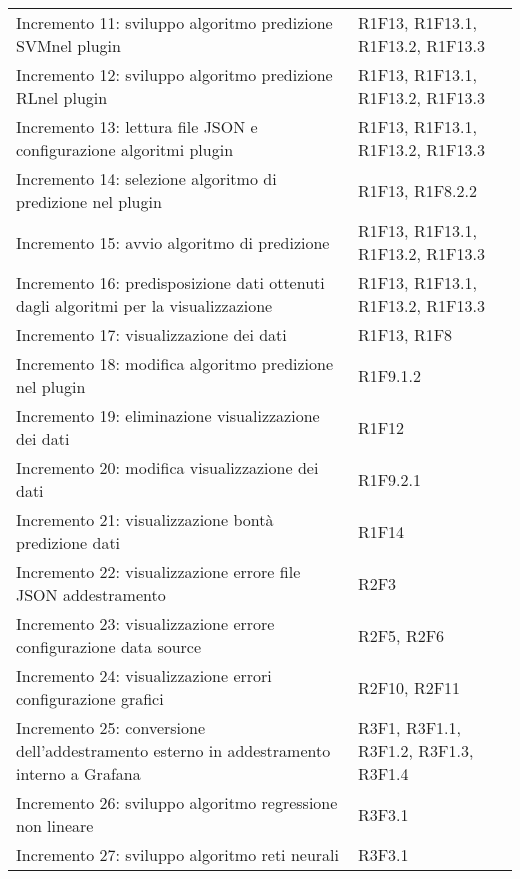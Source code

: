 \begin{longtable} {
		>{\raggedright\arraybackslash}p{85mm}
		>{\raggedleft\arraybackslash}p{40mm}
	}
	Incremento 11: sviluppo algoritmo predizione SVM\glosp nel plugin &
	R1F13, R1F13.1, R1F13.2, R1F13.3 \TBstrut \\ [2mm]
	
	Incremento 12: sviluppo algoritmo predizione RL\glosp nel plugin &
	R1F13, R1F13.1, R1F13.2, R1F13.3 \TBstrut \\ [2mm]
	
	Incremento 13: lettura file JSON e configurazione algoritmi plugin &
	R1F13, R1F13.1, R1F13.2, R1F13.3 \TBstrut \\ [2mm]
	
	Incremento 14: selezione algoritmo di predizione nel plugin &
	R1F13, R1F8.2.2 \TBstrut \\ [2mm]
	
	Incremento 15: avvio algoritmo di predizione &
	R1F13, R1F13.1, R1F13.2, R1F13.3 \TBstrut \\ [2mm]
	
	Incremento 16: predisposizione dati ottenuti dagli algoritmi per la visualizzazione &
	R1F13, R1F13.1, R1F13.2, R1F13.3 \TBstrut \\ [2mm]
	
	Incremento 17: visualizzazione dei dati &
	R1F13, R1F8 \TBstrut \\ [2mm]
	
	Incremento 18: modifica algoritmo predizione nel plugin &
	R1F9.1.2 \TBstrut \\ [2mm]
	
	Incremento 19: eliminazione visualizzazione dei dati &
	R1F12 \TBstrut \\ [2mm]
	
	Incremento 20: modifica visualizzazione dei dati &
	R1F9.2.1 \TBstrut \\ [2mm]
	
	Incremento 21: visualizzazione bontà predizione dati &
	R1F14 \TBstrut \\ [2mm]
	
	Incremento 22: visualizzazione errore file JSON addestramento &
	R2F3 \TBstrut \\ [2mm]
	
	Incremento 23: visualizzazione errore configurazione data source &
	R2F5, R2F6 \TBstrut \\ [2mm]
	
	Incremento 24: visualizzazione errori configurazione grafici &
	R2F10, R2F11 \TBstrut \\ [2mm]
	
	Incremento 25: conversione dell'addestramento esterno in addestramento interno a Grafana\glosp &
	R3F1, R3F1.1, R3F1.2, R3F1.3, R3F1.4 \TBstrut \\ [2mm]
	
	Incremento 26: sviluppo algoritmo regressione non lineare &
	R3F3.1 \TBstrut \\ [2mm]
	
	Incremento 27: sviluppo algoritmo reti neurali &
	R3F3.1 \TBstrut \\ [2mm]
	
\end{longtable}
 
